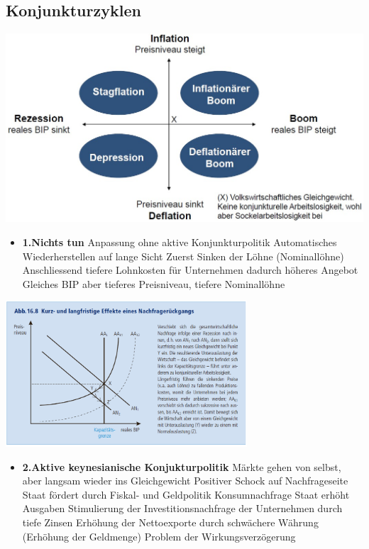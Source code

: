 \subsection{Konjunkturzyklen}
\includegraphics[width=0.85\linewidth]{images/konjukturzyklen.jpg}
\clearpage
\pagebreak
	\begin{itemize}
		\item \textbf{1.Nichts tun} 
		\subitem Anpassung ohne aktive Konjunkturpolitik
		\subitem Automatisches Wiederherstellen auf lange Sicht
		\subitem Zuerst Sinken der Löhne (Nominallöhne)
		\subitem Anschliessend tiefere Lohnkosten für Unternehmen dadurch höheres Angebot
		\subitem Gleiches BIP aber tieferes Preisniveau, tiefere Nominallöhne	
	\end{itemize}
	\includegraphics[width=9cm]{images/nichts.png}
	\begin{itemize}
		\item \textbf{2.Aktive keynesianische Konjukturpolitik}
		\subitem Märkte gehen von selbst, aber langsam wieder ins Gleichgewicht
		\subitem Positiver Schock auf Nachfrageseite
		\subitem Staat fördert durch Fiskal- und Geldpolitik Konsumnachfrage
		\subitem Staat erhöht Ausgaben
		\subitem Stimulierung der Investitionsnachfrage der Unternehmen durch tiefe Zinsen
		\subitem Erhöhung der Nettoexporte durch schwächere Währung (Erhöhung der Geldmenge)
		\subitem Problem der Wirkungsverzögerung
	\end{itemize}
